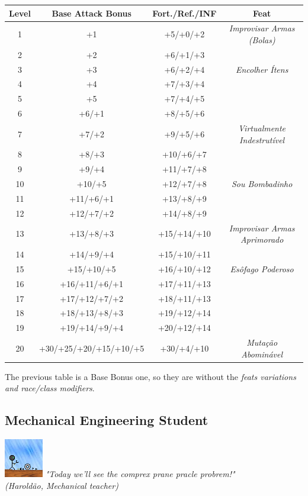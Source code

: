 \documentclass[ letterpaper,12pt]{article}
\begin{document}
\begin{center} \begin{tabular}{|c||c|c|c|}
\hline
{\bf Level}&{\bf Base Attack Bonus}&{\bf Fort./Ref./INF}&{\bf Feat}\\
\hline
1&+1&+5/+0/+2&{\it Improvisar Armas (Bolas)}\\
\hline
2&+2&+6/+1/+3&\\
\hline
3&+3&+6/+2/+4&{\it Encolher Ítens}\\
\hline
4&+4&+7/+3/+4&\\
\hline
5&+5&+7/+4/+5&\\
\hline
6&+6/+1&+8/+5/+6&\\
\hline
7&+7/+2&+9/+5/+6&{\it Virtualmente Indestrutível}\\
\hline
8&+8/+3&+10/+6/+7&\\
\hline
9&+9/+4&+11/+7/+8&\\
\hline
10&+10/+5&+12/+7/+8&{\it Sou Bombadinho}\\
\hline
11&+11/+6/+1&+13/+8/+9&\\
\hline
12&+12/+7/+2&+14/+8/+9&\\
\hline
13&+13/+8/+3&+15/+14/+10&{\it Improvisar Armas Aprimorado}\\
\hline
14&+14/+9/+4&+15/+10/+11&\\
\hline
15&+15/+10/+5&+16/+10/+12&{\it Esôfago Poderoso}\\
\hline
16&+16/+11/+6/+1&+17/+11/+13&\\
\hline
17&+17/+12/+7/+2&+18/+11/+13&\\
\hline
18&+18/+13/+8/+3&+19/+12/+14&\\
\hline
19&+19/+14/+9/+4&+20/+12/+14&\\
\hline
20&+30/+25/+20/+15/+10/+5&+30/+4/+10&{\it Mutação Abominável}\\
\hline
\end{tabular} \end{center}

The previous table is a Base Bonus one, so they are without the {\it feats variations and race/class modifiers}.\\

\subsection{Mechanical Engineering Student}
\includegraphics{../data/classes/Img/engmecanica.png}
{\it "Today we'll see the comprex prane pracle probrem!"\\ (Haroldão, Mechanical teacher)}\\
\end{document}
